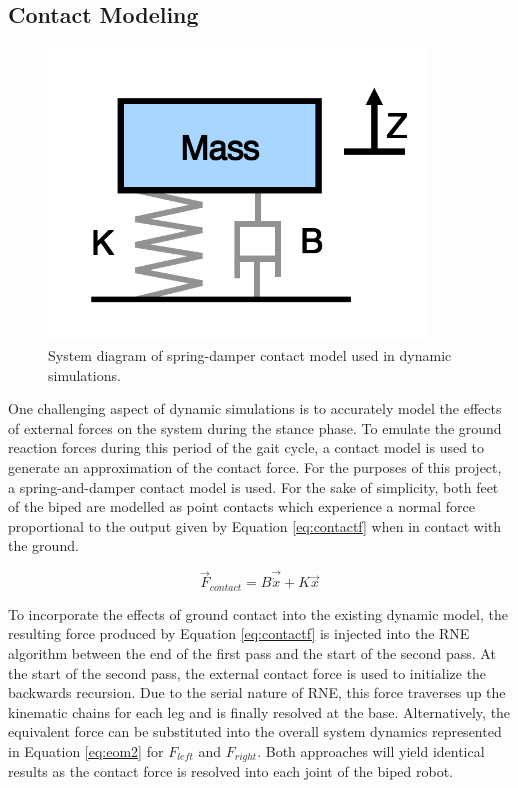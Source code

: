 
\subsection{Contact Modeling} %
\label{sec:contact_modelling}

\begin{figure}[!ht]
	\begin{center}
    \includegraphics[width=100mm]{fig/design/springdamper.png}
	\end{center}
  \caption{System diagram of spring-damper contact model used in dynamic simulations.}
\end{figure}

One challenging aspect of dynamic simulations is to accurately model the effects of external forces on the system during the stance phase. To emulate the ground reaction forces during this period of the gait cycle, a contact model is used to generate an approximation of the contact force. For the purposes of this project, a spring-and-damper contact model is used. For the sake of simplicity, both feet of the biped are modelled as point contacts which experience a normal force proportional to the output given by Equation \ref{eq:contactf} when in contact with the ground. 

\begin{equation}
	\label{eq:contactf}
	\vec{F}_{contact} = B\vec{\dot{x}} + K\vec{x}
\end{equation}


To incorporate the effects of ground contact into the existing dynamic model, the resulting force produced by Equation \ref{eq:contactf} is injected into the RNE algorithm between the end of the first pass and the start of the second pass. At the start of the second pass, the external contact force is used to initialize the backwards recursion. Due to the serial nature of RNE, this force traverses up the kinematic chains for each leg and is finally resolved at the base. Alternatively, the equivalent force can be substituted into the overall system dynamics represented in Equation \ref{eq:eom2} for $F_{left}$ and $F_{right}$. Both approaches will yield identical results as the contact force is resolved into each joint of the biped robot. 

